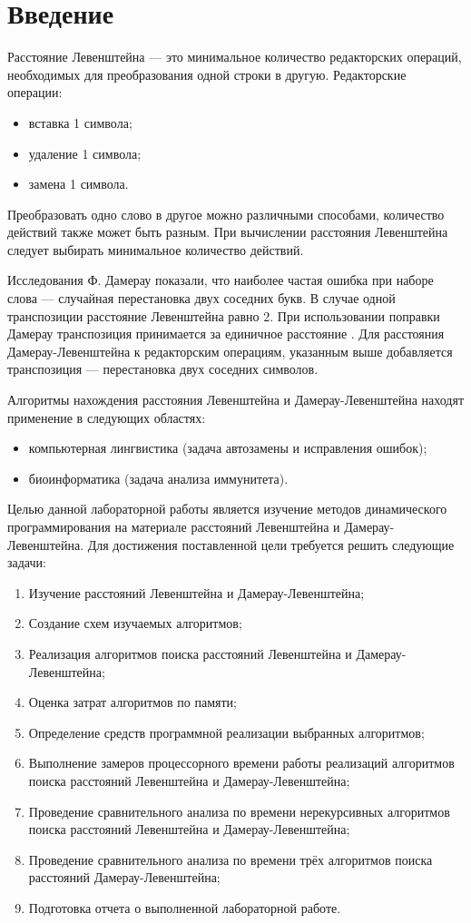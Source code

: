 \chapter*{Введение}

Расстояние Левенштейна --- это минимальное количество редакторских операций, необходимых для преобразования одной строки в другую. Редакторские операции:
\begin{itemize}
	\item вставка 1 символа;
	\item удаление 1 символа;
	\item замена 1 символа.
\end{itemize}

Преобразовать одно слово в другое можно различными способами, количество действий также может быть разным. При вычислении
расстояния Левенштейна следует выбирать минимальное количество
действий.

Исследования Ф. Дамерау показали, что наиболее частая ошибка
при наборе слова --- случайная перестановка двух соседних букв. В случае одной транспозиции расстояние Левенштейна равно 2. При использовании поправки Дамерау транспозиция принимается за единичное расстояние \cite{levenshtein}. Для расстояния Дамерау-Левенштейна к редакторским операциям, указанным выше добавляется транспозиция --- перестановка двух соседних символов. 

Алгоритмы нахождения расстояния Левенштейна и Дамерау-Левенштейна находят применение в следующих областях:
\begin{itemize}
	\item компьютерная лингвистика (задача автозамены и исправления ошибок);
	\item биоинформатика (задача анализа иммунитета).
\end{itemize}

Целью данной лабораторной работы является изучение методов динамического программирования на материале расстояний Левенштейна и Дамерау-Левенштейна. Для достижения поставленной цели требуется решить следующие задачи:

\begin{enumerate}
	\item Изучение расстояний Левенштейна и Дамерау-Левенштейна;
	\item Создание схем изучаемых алгоритмов;
	\item Реализация алгоритмов поиска расстояний Левенштейна и Дамерау-Левенштейна;
	\item Оценка затрат алгоритмов по памяти;
	\item Определение средств программной реализации выбранных алгоритмов;
	\item Выполнение замеров процессорного времени работы реализаций алгоритмов поиска расстояний Левенштейна и Дамерау-Левенштейна;
	\item Проведение сравнительного анализа по времени нерекурсивных алгоритмов поиска расстояний Левенштейна и Дамерау-Левенштейна;
	\item Проведение сравнительного анализа по времени трёх алгоритмов поиска расстояний Дамерау-Левенштейна;
	\item Подготовка отчета о выполненной лабораторной работе.
\end{enumerate}
